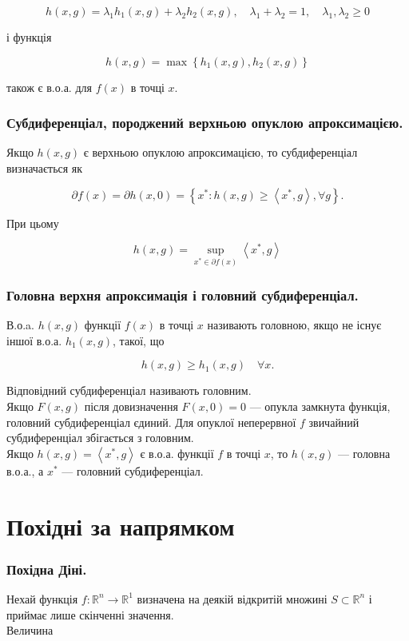 \documentclass[12pt,a4paper]{extarticle}
\numberwithin{section}{part}
\begin{document}
$$
h(x, g)=\lambda_{1} h_{1}(x, g)+\lambda_{2} h_{2}(x, g), \quad \lambda_{1}+\lambda_{2}=1, \quad \lambda_{1}, \lambda_{2} \geq 0
$$

і функція

$$
h(x, g)=\max \left\{h_{1}(x, g), h_{2}(x, g)\right\}
$$

також є в.о.а. для $f(x)$ в точці $x$.

\section{Субдиференціал, породжений верхньою опуклою апроксимацією.}
Якщо $h(x, g)$ є верхньою опуклою апроксимацією, то субдиференціал визначається як

$$
\partial f(x)=\partial h(x, 0)=\left\{x^{*}: h(x, g) \geq\left\langle x^{*}, g\right\rangle, \forall g\right\} .
$$

При цьому

$$
h(x, g)=\sup _{x^{*} \in \partial f(x)}\left\langle x^{*}, g\right\rangle
$$

\section{Головна верхня апроксимація і головний субдиференціал.}
В.о.a. $h(x, g)$ функції $f(x)$ в точці $x$ називають головною, якщо не існує іншої в.о.а. $h_{1}(x, g)$, такої, що

$$
h(x, g) \geq h_{1}(x, g) \quad \forall x .
$$

Відповідний субдиференціал називають головним.\\
Якщо $F(x, g)$ після довизначення $F(x, 0)=0$ --- опукла замкнута функція, головний субдиференціал єдиний. Для опуклої неперервної $f$ звичайний субдиференціал збігається з головним.\\
Якщо $h(x, g)=\left\langle x^{*}, g\right\rangle$ є в.о.а. функції $f$ в точці $x$, то $h(x, g)$ --- головна в.о.а., а $x^{*}$ --- головний субдиференціал.

\part{Похідні за напрямком}

\section{Похідна Діні.}
Нехай функція $f: \mathbb{R}^{n} \rightarrow \mathbb{R}^{1}$ визначена на деякій відкритій множині $S \subset \mathbb{R}^{n}$ і приймає лише скінченні значення.\\
Величина
\end{document}

